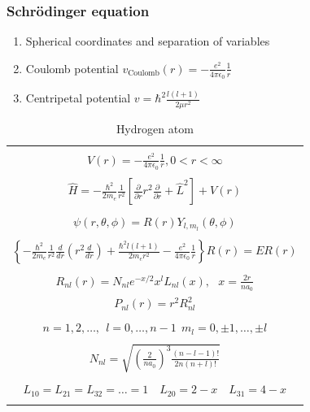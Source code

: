 \documentclass[11pt]{article}
\begin{document}
\subsubsection{Schr\"{o}dinger equation}
\label{sec:org1f1c62d}
\begin{enumerate}
\item Spherical coordinates and separation of variables
\item Coulomb potential \(v_\mathrm{Coulomb}(r)=-\frac{e^2}{4\pi\epsilon_0}\frac{1}{r}\)
\item Centripetal potential  \(v=\hbar^2\frac{l(l+1)}{2\mu r^2}\)
\end{enumerate}
\begin{table}[]
   \begin{center}
   \caption{Hydrogen atom}
    \label{Hydrogen atom}
\begin{tabular}[h]{|c|}
\hline
 \\
$\displaystyle       V(r) = -\frac{e^2}{4\pi\epsilon_0}\frac{1}{r}, 0 < r< \infty$ \\
 \\
$\displaystyle     \hat H = -\frac{\hbar^2}{2m_e}\frac{1}{r^2}\left [
  \frac{\partial}{\partial r}r^2\frac{\partial}{\partial r} + \hat L^2 \right ] +V(r)$ \\
\\
$\displaystyle \psi(r,\theta,\phi) = R(r)Y_{l,m_l}(\theta,\phi) $ \\
\\
$\displaystyle   \left \{ -\frac{\hbar^2}{2m_e}\frac{1}{r^2}
            \frac{d}{d r} \left ( r^2 \frac{d}{dr}\right ) + \frac{\hbar^2
              l(l+1)}{2 m_e r^2}
          -\frac{e^2}{4\pi\epsilon_0}\frac{1}{r}\right \} R(r) = E R(r) $ \\
\\
$\displaystyle R_{nl}(r) = N_{nl} e^{-x/2} x^l L_{nl}(x),\ \ \  x = \frac{2 r}{n a_0} $
\\
$\displaystyle P_{nl}(r) = r^2 R_{nl}^2 $
\\
\\
$\displaystyle n = 1, 2, \ldots,\ \  l = 0, \ldots, n-1 \ \ m_l = 0,\pm 1, \ldots, \pm l$
\\
\\
$\displaystyle N_{nl} = \sqrt{\left ( \frac{2}{na_0}\right )^3 \frac{(n-l-1)!}{2n(n+l)!}}$
\\
\\
$\displaystyle L_{10} = L_{21} = L_{32} = \ldots =1 \quad L_{20} = 2 - x \quad L_{31} = 4-x$
\\
\\

\end{tabular}
\end{center}
\end{table}
\end{document}

